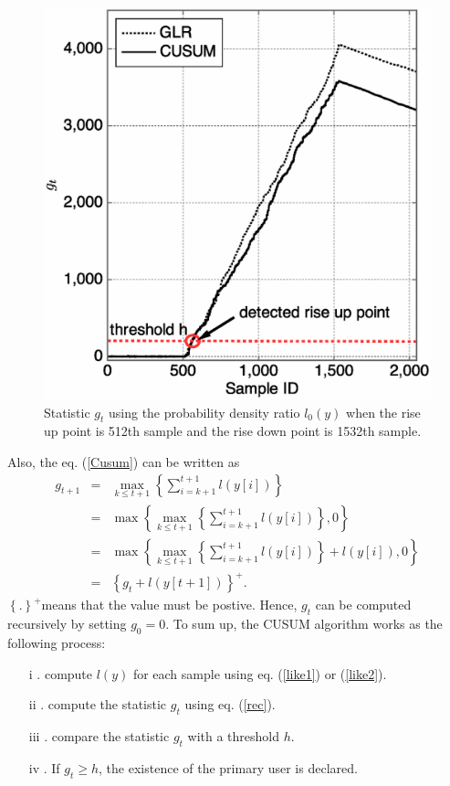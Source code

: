 \begin{figure}[t]
\centering
\includegraphics[width=120mm]{OFF2ON.eps}
\caption{ Statistic $g_t$ using the probability density ratio $l_0(y)$  when the rise up point is 512th sample and the rise down point is 1532th sample.}
\label{OFF2ON}
\end{figure}

Also, the eq. (\ref{Cusum}) can be written as
\begin{eqnarray}
g_{t+1} &=& \max_{k \leq t+1}\left\{\sum_{i=k+1}^{t+1}l(y[i])\right\} \nonumber \\ 
&=& \max\left\{\max_{k \leq t+1}\left\{\sum_{i=k+1}^{t+1}l(y[i])\right\},0\right\} \nonumber \\
&=& \max\left\{\max_{k \leq t+1}\left\{\sum_{i=k+1}^{t+1}l(y[i])\right\}+l(y[i]),0\right\} \nonumber \\
&=& \left\{g_t+l(y[t+1])\right\}^{+}.
\label{rec}
\end{eqnarray}
$\left\{.\right\}^{+}$means that the value must be postive. Hence, $g_t$ can be computed recursively by setting $g_0=0$. To sum up, the CUSUM algorithm works as the following process:
\begin{enumerate}
  \item[i]. compute $l(y)$ for each sample using eq. (\ref{like1}) or (\ref{like2}).
  \item[ii]. compute the statistic $g_t$ using eq. (\ref{rec}).
  \item[iii]. compare the statistic $g_t$ with a threshold $h$.
  \item[iv]. If $g_t \geq h$, the existence of the primary user is declared.
\end{enumerate}

